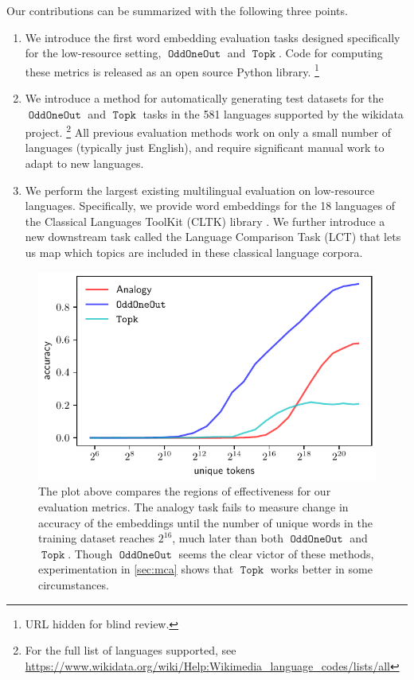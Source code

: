 \documentclass[11pt,a4paper]{article}
\DeclareMathOperator{\OddOneOut}{\texttt{OddOneOut}}
\DeclareMathOperator{\topk}{\texttt{Topk}}
\begin{document}
Our contributions can be summarized with the following three points.

\label{sec:contributions}
\begin{enumerate}
    \item 
    We introduce the first word embedding evaluation tasks designed specifically for the low-resource setting, $\OddOneOut$ and $\topk$.
    Code for computing these metrics is released as an open source Python library.%
    \footnote{
        URL hidden for blind review.
    }
    \item 
    We introduce a method for automatically generating test datasets for the $\OddOneOut$ and $\topk$ tasks in the 581 languages supported by the wikidata project.%
        \footnote{For the full list of languages supported, see \url{https://www.wikidata.org/wiki/Help:Wikimedia_language_codes/lists/all}}
    All previous evaluation methods work on only a small number of languages (typically just English),
    and require significant manual work to adapt to new languages.
	\item 
    We perform the largest existing multilingual evaluation on low-resource languages.
    Specifically, we provide word embeddings for the 18 languages of the Classical Languages ToolKit (CLTK) library \citep{johnson2014}.
    We further introduce a new downstream task called the Language Comparison Task (LCT) that lets us map which topics are included in these classical language corpora.
\end{enumerate}

\begin{figure}
\centering
\includegraphics[width=1\columnwidth]{size_vs_acc.pdf} 
\caption{The plot above compares the regions of effectiveness for our evaluation metrics. 
The analogy task fails to measure change in accuracy of the embeddings until the number of unique words in the training dataset reaches  $2^{16}$, much later than both $\OddOneOut$ and $\topk$. 
Though $\OddOneOut$ seems the clear victor of these methods, experimentation in \ref{sec:mca} shows that $\topk$ works better in some circumstances.}
\label{fig:size_vs_acc}
\end{figure}
\end{document}
